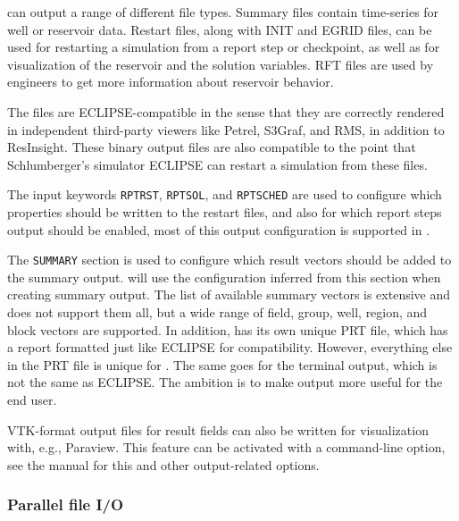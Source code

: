 \opmflow can output a range of different file types. Summary files contain
time-series for well or reservoir data. Restart files, along with INIT
and EGRID files, can be used for restarting a simulation from a report
step or checkpoint, as well as for visualization of the reservoir and
the solution variables. RFT files are used by engineers to get more
information about reservoir behavior.

The files are ECLIPSE-compatible in the sense that they are correctly
rendered in independent third-party viewers like Petrel, S3Graf, and
RMS, in addition to \opm ResInsight. These binary output
files are also compatible to the point that Schlumberger's
simulator ECLIPSE can restart a simulation from these files.

The input keywords \texttt{RPTRST}, \texttt{RPTSOL}, and \texttt{RPTSCHED} are
used to configure which properties should be written to the restart files, and
also for which report steps output should be enabled, most of this output
configuration is supported in \opmflow.

The \texttt{SUMMARY} section is used to configure
which result vectors should be added to the summary output. \opmflow will use the
configuration inferred from this section when creating summary
output. The list of available summary vectors is extensive and \opmflow does not
support them all, but a wide range of field, group, well, region, and block
vectors are supported.
In addition, \opmflow has its own unique PRT file, which has a
report formatted just like ECLIPSE for compatibility.
However, everything else in the PRT file is unique for
\opmflow. The same goes for the terminal output, which is not the
same as ECLIPSE. The ambition is to make output more useful for the
end user.

VTK-format output files for result fields can also be written for visualization with,
e.g., Paraview. This feature can be activated with a command-line option, see the manual
\citep{flowmanual} for this and other output-related options.

\subsubsection{Parallel file I/O}

